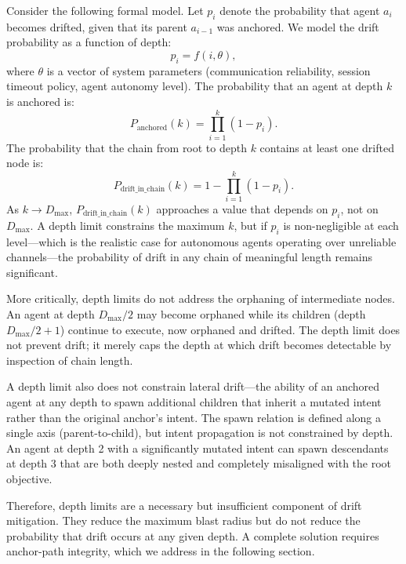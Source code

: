 Consider the following formal model. Let $p_i$ denote the probability that agent $a_i$ becomes drifted, given that its parent $a_{i-1}$ was anchored. We model the drift probability as a function of depth:
\[
p_i = f(i, \theta),
\]
where $\theta$ is a vector of system parameters (communication reliability, session timeout policy, agent autonomy level). The probability that an agent at depth $k$ is anchored is:
\[
P_{\text{anchored}}(k) = \prod_{i=1}^{k} (1 - p_i).
\]
The probability that the chain from root to depth $k$ contains at least one drifted node is:
\[
P_{\text{drift\_in\_chain}}(k) = 1 - \prod_{i=1}^{k} (1 - p_i).
\]
As $k \to D_{\max}$, $P_{\text{drift\_in\_chain}}(k)$ approaches a value that depends on $p_i$, not on $D_{\max}$. A depth limit constrains the maximum $k$, but if $p_i$ is non-negligible at each level—which is the realistic case for autonomous agents operating over unreliable channels—the probability of drift in any chain of meaningful length remains significant.

More critically, depth limits do not address the orphaning of intermediate nodes. An agent at depth $D_{\max}/2$ may become orphaned while its children (depth $D_{\max}/2 + 1$) continue to execute, now orphaned and drifted. The depth limit does not prevent drift; it merely caps the depth at which drift becomes detectable by inspection of chain length.

A depth limit also does not constrain lateral drift—the ability of an anchored agent at any depth to spawn additional children that inherit a mutated intent rather than the original anchor's intent. The spawn relation is defined along a single axis (parent-to-child), but intent propagation is not constrained by depth. An agent at depth 2 with a significantly mutated intent can spawn descendants at depth 3 that are both deeply nested and completely misaligned with the root objective.

Therefore, depth limits are a necessary but insufficient component of drift mitigation. They reduce the maximum blast radius but do not reduce the probability that drift occurs at any given depth. A complete solution requires anchor-path integrity, which we address in the following section.
